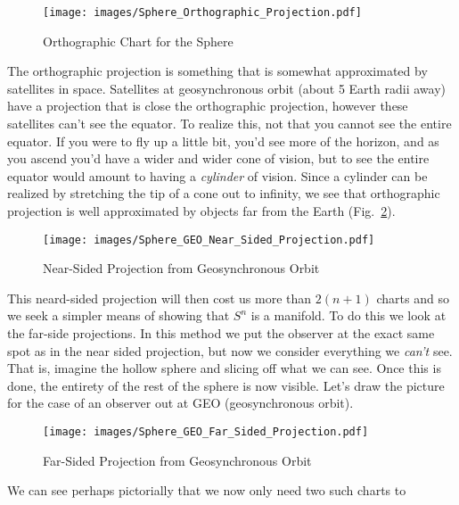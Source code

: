         \begin{figure}[H]
            \centering
            \captionsetup{type=figure}
            \texttt{[image: images/Sphere\_Orthographic\_Projection.pdf]}
            \caption{Orthographic Chart for the Sphere}
            \label{fig:Orthographic_Chart_Sphere}
        \end{figure}
        The orthographic projection is something that is somewhat approximated
        by satellites in space. Satellites at geosynchronous orbit (about
        5 Earth radii away) have a projection that is close the orthographic
        projection, however these satellites can't see the equator. To realize
        this, not that you cannot see the entire equator. If you were to fly up
        a little bit, you'd see more of the horizon, and as you ascend you'd
        have a wider and wider cone of vision, but to see the entire equator
        would amount to having a \textit{cylinder} of vision. Since a cylinder
        can be realized by stretching the tip of a cone out to infinity, we see
        that orthographic projection is well approximated by objects far from
        the Earth (Fig.~\ref{fig:GEO_Projection}).
        \begin{figure}[H]
            \centering
            \captionsetup{type=figure}
            \texttt{[image: images/Sphere\_GEO\_Near\_Sided\_Projection.pdf]}
            \caption{Near-Sided Projection from Geosynchronous Orbit}
            \label{fig:GEO_Projection}
        \end{figure}
        This neard-sided projection will then cost us more than $2(n+1)$ charts
        and so we seek a simpler means of showing that $S^{n}$ is a manifold.
        To do this we look at the far-side projections. In this method we put
        the observer at the exact same spot as in the near sided projection, but
        now we consider everything we \textit{can't} see. That is, imagine
        the hollow sphere and slicing off what we can see. Once this is done,
        the entirety of the rest of the sphere is now visible. Let's draw the
        picture for the case of an observer out at GEO (geosynchronous orbit).
        \begin{figure}[H]
            \centering
            \captionsetup{type=figure}
            \texttt{[image: images/Sphere\_GEO\_Far\_Sided\_Projection.pdf]}
            \caption{Far-Sided Projection from Geosynchronous Orbit}
            \label{fig:GEO_Far_Projection}
        \end{figure}
        We can see perhaps pictorially that we now only need two such charts to
